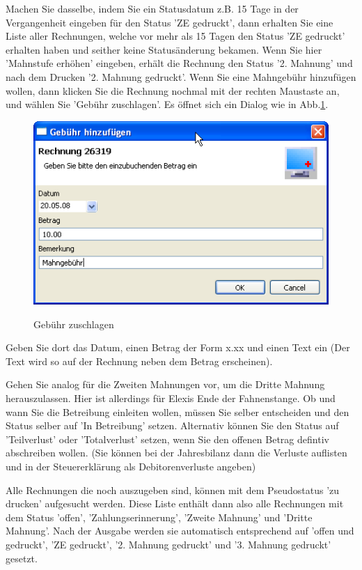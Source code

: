 \documentclass[a4paper]{scrartcl}
\begin{document}
\medskip

Machen Sie dasselbe, indem Sie ein Statusdatum z.B. 15 Tage in der Vergangenheit eingeben für den Status 'ZE gedruckt', dann erhalten Sie eine Liste aller Rechnungen, welche vor mehr als 15 Tagen den Status 'ZE gedruckt' erhalten haben und seither keine Statusänderung bekamen. Wenn Sie hier 'Mahnstufe erhöhen' eingeben, erhält die Rechnung den Status '2. Mahnung' und nach dem Drucken '2. Mahnung gedruckt'. Wenn Sie eine Mahngebühr hinzufügen wollen, dann klicken Sie die Rechnung nochmal mit der rechten Maustaste an, und wählen Sie 'Gebühr zuschlagen'. Es öffnet sich ein Dialog wie in Abb.\ref{fig:abr22}.
\begin{figure}
  \includegraphics{abr22}\\
  \caption{Gebühr zuschlagen}\label{fig:abr22}
\end{figure}
Geben Sie dort das Datum, einen Betrag der Form x.xx und einen Text ein (Der Text wird so auf der Rechnung neben dem Betrag erscheinen).

\medskip
{}
Gehen Sie analog für die Zweiten Mahnungen vor, um die Dritte Mahnung herauszulassen. Hier ist allerdings für Elexis Ende der Fahnenstange. Ob und wann Sie die Betreibung einleiten wollen, müssen Sie selber entscheiden und den Status selber auf 'In Betreibung' setzen. Alternativ können Sie den Status auf 'Teilverlust' oder 'Totalverlust' setzen, wenn Sie den offenen Betrag defintiv abschreiben wollen. (Sie können bei der Jahresbilanz dann die Verluste auflisten und in der Steuererklärung als Debitorenverluste angeben)

\medskip

Alle Rechnungen die noch auszugeben sind, können mit dem Pseudostatus 'zu drucken' aufgesucht werden. Diese Liste enthält dann also alle Rechnungen mit dem Status 'offen', 'Zahlungserinnerung', 'Zweite Mahnung' und 'Dritte Mahnung'. Nach der Ausgabe werden sie automatisch entsprechend auf 'offen und gedruckt', 'ZE gedruckt', '2. Mahnung gedruckt' und '3. Mahnung gedruckt' gesetzt.
\end{document}
